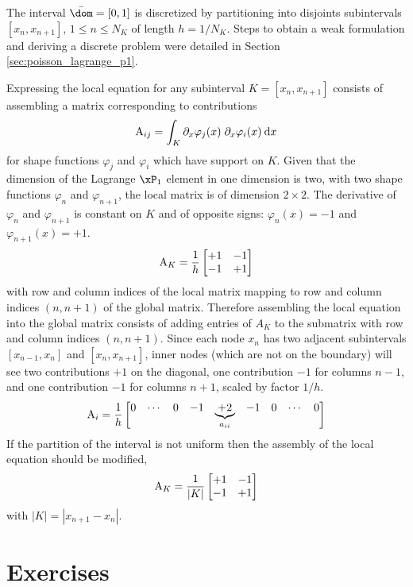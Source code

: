 The interval $\bar\dom = [0,1]$ is discretized by partitioning into disjoints subintervals $[x_{n}, x_{n+1}]$, $1\leq n \leq N_K$ of length $h = 1 / N_K$.
Steps to obtain a weak formulation and deriving a discrete problem were detailed in Section \ref{sec:poisson_lagrange_p1}.

Expressing the local equation for any subinterval $K = [x_{n}, x_{n+1}]$ consists of assembling a matrix corresponding to contributions
\begin{equation*}
{\mathrm A}_{ij} = \int_{K} \partial_{x}\varphi_j(x)\;\partial_{x}\varphi_i(x) \hspace{.5ex}{\mathrm d} x
\end{equation*}
for shape functions $\varphi_j$ and $\varphi_i$ which have support on $K$.
Given that the dimension of the Lagrange $\xPone$ element in one dimension is two, with two shape functions $\varphi_n$ and $\varphi_{n+1}$, the local matrix is of dimension $2\times 2$.
The derivative of $\varphi_n$ and $\varphi_{n+1}$ is constant on $K$ and of opposite signs: $\varphi_n(x) = -1$ and $\varphi_{n+1}(x) = +1$.
\begin{equation*}
{\mathrm A}_{K} = \frac{1}{h}
\begin{bmatrix}
+1 & -1 \\
-1 & +1 \\
\end{bmatrix}
\end{equation*}
with row and column indices of the local matrix mapping to row and column indices $(n , n+1)$ of the global matrix.
Therefore assembling the local equation into the global matrix consists of adding entries of $A_K$ to the submatrix with row and column indices $(n , n+1)$.
Since each node $x_n$ has two adjacent subintervals $[x_{n-1}, x_{n}]$ and $[x_{n}, x_{n+1}]$, inner nodes (which are not on the boundary) will see two contributions $+1$ on the diagonal, one contribution $-1$ for columns $n-1$, and one contribution $-1$ for columns $n+1$, scaled by factor $1/h$.
\begin{equation*}
{\mathrm A}_{i} = \frac{1}{h}
\begin{bmatrix}
0 & \cdots & 0 & -1 & \underbrace{+2}_{a_{ii}} & -1 & 0 & \cdots & 0
\end{bmatrix}
\end{equation*}
If the partition of the interval is not uniform then the assembly of the local equation should be modified,
\begin{equation*}
{\mathrm A}_{K} = \frac{1}{|K|}
\begin{bmatrix}
+1 & -1 \\
-1 & +1 \\
\end{bmatrix}
\end{equation*}
with $|K| = |x_{n+1} - x_{n}|$.
\newpage

\section{Exercises}
